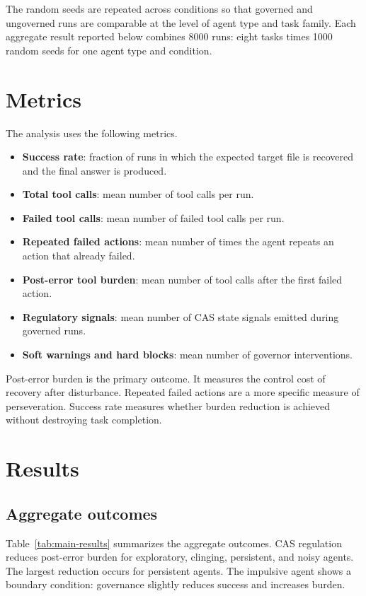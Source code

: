 \documentclass[11pt]{article}
\begin{document}
The random seeds are repeated across conditions so that governed and ungoverned runs are comparable at the level of agent type and task family. Each aggregate result reported below combines 8000 runs: eight tasks times 1000 random seeds for one agent type and condition.

\section{Metrics}

The analysis uses the following metrics.

\begin{itemize}[leftmargin=1.5em]
    \item \textbf{Success rate}: fraction of runs in which the expected target file is recovered and the final answer is produced.
    \item \textbf{Total tool calls}: mean number of tool calls per run.
    \item \textbf{Failed tool calls}: mean number of failed tool calls per run.
    \item \textbf{Repeated failed actions}: mean number of times the agent repeats an action that already failed.
    \item \textbf{Post-error tool burden}: mean number of tool calls after the first failed action.
    \item \textbf{Regulatory signals}: mean number of CAS state signals emitted during governed runs.
    \item \textbf{Soft warnings and hard blocks}: mean number of governor interventions.
\end{itemize}

Post-error burden is the primary outcome. It measures the control cost of recovery after disturbance. Repeated failed actions are a more specific measure of perseveration. Success rate measures whether burden reduction is achieved without destroying task completion.

\section{Results}

\subsection{Aggregate outcomes}

Table~\ref{tab:main-results} summarizes the aggregate outcomes. CAS regulation reduces post-error burden for exploratory, clinging, persistent, and noisy agents. The largest reduction occurs for persistent agents. The impulsive agent shows a boundary condition: governance slightly reduces success and increases burden.
\end{document}
